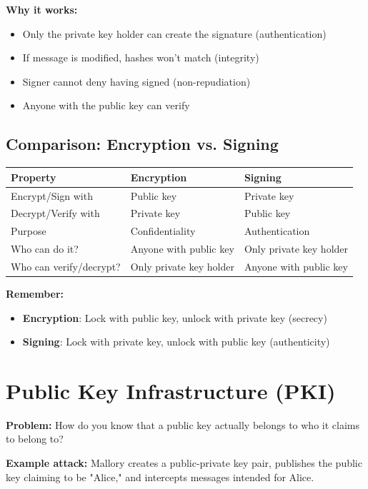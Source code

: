 \documentclass[11pt,a4paper]{report}
\begin{document}
\textbf{Why it works:}
\begin{itemize}
\item Only the private key holder can create the signature (authentication)
\item If message is modified, hashes won't match (integrity)
\item Signer cannot deny having signed (non-repudiation)
\item Anyone with the public key can verify
\end{itemize}

\subsection{Comparison: Encryption vs. Signing}

\begin{center}
\begin{tabular}{|l|l|l|}
\hline
\textbf{Property} & \textbf{Encryption} & \textbf{Signing} \\
\hline
Encrypt/Sign with & Public key & Private key \\
Decrypt/Verify with & Private key & Public key \\
Purpose & Confidentiality & Authentication \\
Who can do it? & Anyone with public key & Only private key holder \\
Who can verify/decrypt? & Only private key holder & Anyone with public key \\
\hline
\end{tabular}
\end{center}

\textbf{Remember:}
\begin{itemize}
\item \textbf{Encryption}: Lock with public key, unlock with private key (secrecy)
\item \textbf{Signing}: Lock with private key, unlock with public key (authenticity)
\end{itemize}

\section{Public Key Infrastructure (PKI)}

\textbf{Problem:} How do you know that a public key actually belongs to who it claims to belong to?

\textbf{Example attack:} Mallory creates a public-private key pair, publishes the public key claiming to be "Alice," and intercepts messages intended for Alice.
\end{document}
